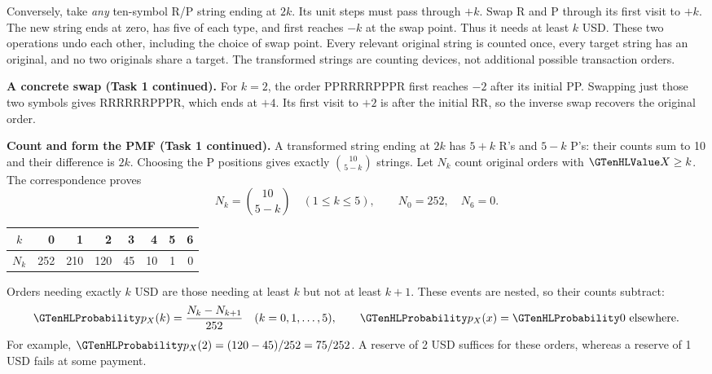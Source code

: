 Conversely, take \emph{any} ten-symbol R/P string ending at $2k$. Its unit steps must pass through $+k$. Swap R and P through its first visit to $+k$. The new string ends at zero, has five of each type, and first reaches $-k$ at the swap point. Thus it needs at least $k$ USD. These two operations undo each other, including the choice of swap point. Every relevant original string is counted once, every target string has an original, and no two originals share a target. The transformed strings are counting devices, not additional possible transaction orders.

\clearpage
\textbf{A concrete swap (Task 1 continued).} For $k=2$, the order PPRRRRPPPR first reaches $-2$ after its initial PP. Swapping just those two symbols gives RRRRRRPPPR, which ends at $+4$. Its first visit to $+2$ is after the initial RR, so the inverse swap recovers the original order.

\textbf{Count and form the PMF (Task 1 continued).} A transformed string ending at $2k$ has $5+k$ R's and $5-k$ P's: their counts sum to 10 and their difference is $2k$. Choosing the P positions gives exactly $\binom{10}{5-k}$ strings. Let $N_k$ count original orders with $\cTwoValue{X}\geq k$. The correspondence proves
\[
N_k=\binom{10}{5-k}\quad(1\leq k\leq5),\qquad N_0=252,\quad N_6=0.
\]
\begin{center}\begin{tabular}{c|rrrrrrr}\toprule
$k$ & 0 & 1 & 2 & 3 & 4 & 5 & 6 \\\midrule
$N_k$ & 252 & 210 & 120 & 45 & 10 & 1 & 0 \\\bottomrule
\end{tabular}\end{center}
Orders needing exactly $k$ USD are those needing at least $k$ but not at least $k+1$. These events are nested, so their counts subtract:
\[
\cTwoMassHL{p_X(k)}=\frac{N_k-N_{k+1}}{252}\quad(k=0,1,\ldots,5),
\qquad \cTwoMassHL{p_X(x)}=\cTwoMassHL{0}\text{ elsewhere}.
\]
For example, $\cTwoMassHL{p_X(2)}=(120-45)/252=75/252$. A reserve of 2 USD suffices for these orders, whereas a reserve of 1 USD fails at some payment.

